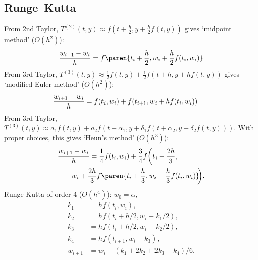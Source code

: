 \documentclass[b4paper,10pt]{memoir}
\begin{document}
\begin{multicols*}{3}
    \section{Runge--Kutta}
    \s From 2nd Taylor, $T^{(2)}(t,y) \approx f (t + \frac h2, y + \frac h2f (t, y))$ gives `midpoint method' ($O(h^2)$):
    \[ \frac{w_{i+1}-w_i}h = f\paren{t_i+\frac h2,w_i+\frac h2 f(t_i,w_i)}\]
    \s From 3rd Taylor, $T^{(3)}(t,y) \approx\frac12 f(t,y)+\frac12 f(t+h, y+hf(t,y))$ gives `modified Euler method' ($O(h^2)$):
    \[ \mkern-30mu \frac{w_{i+1}-w_i}h = f(t_i,w_i)+f(t_{i+1},w_i+hf(t_i,w_i))\]
    \s From 3rd Taylor, $T^{(3)}(t,y) \approx a_1 f(t,y)+a_2 f (t + \alpha_1 , y + \delta_ 1 f (t + \alpha_ 2 , y + \delta_ 2 f (t, y)))$. With proper choices, this gives `Heun's method' ($O(h^3)$):
    \begin{align*}
         & \frac{w_{i+1}-w_i}h =\frac14 f(t_i,w_i) + \frac34 f\bigg(t_i+\frac{2h}3,
        \\&\qquad w_i+\frac{2h}3 f\paren{t_i+\frac h3, w_i+\frac h3 f(t_i,w_i)}\mkern-5mu\bigg).
    \end{align*}
    \s Runge-Kutta of order 4 ($O(h^4)$): $w_0 = \alpha$,
    \begin{align*}
        k_1     & = h f(t_i,w_i),                \\
        k_2     & = h f(t_i+h/2,w_i + k_1/2),    \\
        k_3     & = h f(t_i+h/2,w_i + k_2/2),    \\
        k_4     & = h f(t_{i+1},w_i+k_3),        \\
        w_{i+1} & = w_i + (k_1+2k_2+2k_3+k_4)/6.
    \end{align*}

    \setcounter{section}{5}

\end{multicols*}
\end{document}
